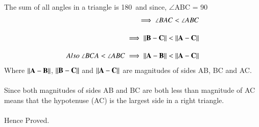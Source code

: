 \documentclass[journal,12pt,twocolumn]{IEEEtran}
\begin{document}
The sum of all angles in a triangle is 180\degree \ and since, $\angle$ABC = 90\degree
\begin{align}
\implies \angle BAC < \angle ABC \\[1em]
\implies \lVert\mathbf{B-C}\rVert < \lVert\mathbf{A-C}\rVert \\[1em]   
Also \ \angle BCA < \angle ABC \implies \lVert\mathbf{A-B}\rVert < \lVert\mathbf{A-C}\rVert
\end{align}
Where $\lVert\mathbf{A-B}\rVert$, $\lVert\mathbf{B-C}\rVert$ and $\lVert\mathbf{A-C}\rVert$ are magnitudes of sides AB, BC and AC.\\\\
Since both magnitudes of sides AB and BC are both less than magnitude of AC means that the hypotenuse (AC) is the largest side in a right triangle.\\\\
Hence Proved.
\end{document}
